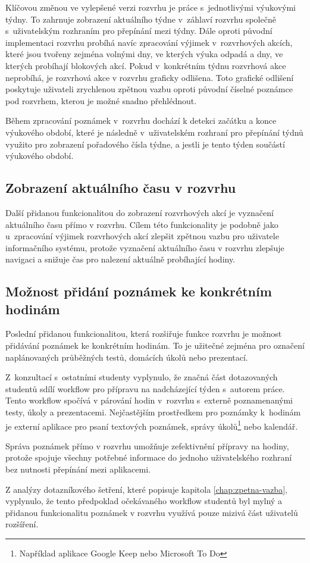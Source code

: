 Klíčovou změnou ve vylepšené verzi rozvrhu je práce s~jednotlivými výukovými týdny. To zahrnuje zobrazení aktuálního týdne v~záhlaví rozvrhu společně s~uživatelským rozhraním pro přepínání mezi týdny. Dále oproti původní implementaci rozvrhu probíhá navíc zpracování výjimek v~rozvrhových akcích, které jsou tvořeny zejména volnými dny, ve kterých výuka odpadá a dny, ve kterých probíhají blokových akcí. Pokud v~konkrétním týdnu rozvrhová akce neprobíhá, je rozvrhová akce v rozvrhu graficky odlišena. Toto grafické odlišení poskytuje uživateli zrychlenou zpětnou vazbu oproti původní číselné poznámce pod rozvrhem, kterou je možné snadno přehlédnout.

Během zpracování poznámek v~rozvrhu dochází k detekci začátku a konce výukového období, které je následně v~uživatelském rozhraní pro přepínání týdnů využito pro zobrazení pořadového čísla týdne, a jestli je tento týden součástí výukového období.

\subsection{Zobrazení aktuálního času v rozvrhu}

Další přidanou funkcionalitou do zobrazení rozvrhových akcí je vyznačení aktuálního času přímo v rozvrhu. Cílem této funkcionality je podobně jako u~zpracování výjimek rozvrhových akcí zlepšit zpětnou vazbu pro uživatele informačního systému, protože vyznačení aktuálního času v rozvrhu zlepšuje navigaci a snižuje čas pro nalezení aktuálně probíhající hodiny. 

\subsection{Možnost přidání poznámek ke konkrétním hodinám}

Poslední přidanou funkcionalitou, která rozšiřuje funkce rozvrhu je možnost přidávání poznámek ke konkrétním hodinám. To je užitečné zejména pro označení naplánovaných průběžných testů, domácích úkolů nebo prezentací. 

Z~konzultací s~ostatními studenty vyplynulo, že značná část dotazovaných studentů sdílí workflow pro přípravu na nadcházející týden s~autorem práce. Tento workflow spočívá v párování hodin v~rozvrhu s~externě poznamenanými testy, úkoly a prezentacemi. Nejčastějším prostředkem pro poznámky k~hodinám je externí aplikace pro psaní textových poznámek, správy úkolů\footnote{Například aplikace Google Keep nebo Microsoft To Do} nebo kalendář.

Správa poznámek přímo v rozvrhu umožňuje zefektivnění přípravy na hodiny, protože spojuje všechny potřebné informace do jednoho uživatelského rozhraní bez nutnosti přepínání mezi aplikacemi.

Z analýzy dotazníkového šetření, které popisuje kapitola \ref{chap:zpetna-vazba}, vyplynulo, že tento předpoklad očekávaného workflow studentů byl mylný a přidanou funkcionalitu poznámek v rozvrhu využívá pouze mizivá část uživatelů rozšíření.